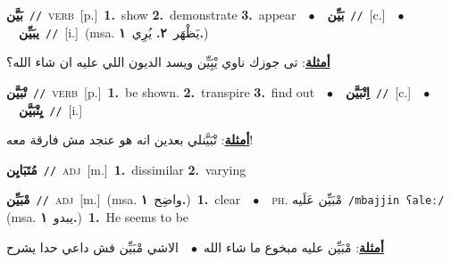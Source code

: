 \documentclass[10pt,a4paper,twoside]{article} %
\begin{document}
\begin{multicols}{2}
{\setlength\topsep{0pt}\textbf{\foreignlanguage{arabic}{بَيَّن}}\ {\color{gray}\texttt{//}\color{black}}\ \textsc{verb}\ [p.]\ \textbf{1.}~show  \textbf{2.}~demonstrate  \textbf{3.}~appear\ \ $\bullet$\ \ \setlength\topsep{0pt}\textbf{\foreignlanguage{arabic}{بَيِّن}}\ {\color{gray}\texttt{//}\color{black}}\ [c.]\ \ $\bullet$\ \ \setlength\topsep{0pt}\textbf{\foreignlanguage{arabic}{يبَيِّن}}\ {\color{gray}\texttt{//}\color{black}}\ [i.]\ \color{gray}(msa. \foreignlanguage{arabic}{يَظْهَر}~\foreignlanguage{arabic}{\textbf{٢.}}  \foreignlanguage{arabic}{يُرِي}~\foreignlanguage{arabic}{\textbf{١.}})\color{black}\  \begin{flushright}\color{gray}\foreignlanguage{arabic}{\textbf{\underline{\foreignlanguage{arabic}{أمثلة}}}: تى جوزك ناوي يْبَِيِّن ويسد الديون اللي عليه ان شاء الله؟}\end{flushright}\color{black}} \vspace{2mm}

{\setlength\topsep{0pt}\textbf{\foreignlanguage{arabic}{تْبَيَّن}}\ {\color{gray}\texttt{//}\color{black}}\ \textsc{verb}\ [p.]\ \textbf{1.}~be shown.  \textbf{2.}~transpire  \textbf{3.}~find out\ \ $\bullet$\ \ \setlength\topsep{0pt}\textbf{\foreignlanguage{arabic}{اِتْبَيَّن}}\ {\color{gray}\texttt{//}\color{black}}\ [c.]\ \ $\bullet$\ \ \setlength\topsep{0pt}\textbf{\foreignlanguage{arabic}{يِتْبَيَّن}}\ {\color{gray}\texttt{//}\color{black}}\ [i.]\  \begin{flushright}\color{gray}\foreignlanguage{arabic}{\textbf{\underline{\foreignlanguage{arabic}{أمثلة}}}: تْبَيَّنلي بعدين انه هو عنجد مش فارقة معه!}\end{flushright}\color{black}} \vspace{2mm}

{\setlength\topsep{0pt}\textbf{\foreignlanguage{arabic}{مُتَبَايِن}}\ {\color{gray}\texttt{//}\color{black}}\ \textsc{adj}\ [m.]\ \textbf{1.}~dissimilar  \textbf{2.}~varying\ } \vspace{2mm}

{\setlength\topsep{0pt}\textbf{\foreignlanguage{arabic}{مْبَيِّن}}\ {\color{gray}\texttt{//}\color{black}}\ \textsc{adj}\ [m.]\ \color{gray}(msa. \foreignlanguage{arabic}{واضِح}~\foreignlanguage{arabic}{\textbf{١.}})\color{black}\ \textbf{1.}~clear\ \ $\bullet$\ \ \textsc{ph.} \color{gray} \foreignlanguage{arabic}{مْبَيِّن عَلَيه}\color{black}\ {\color{gray}\texttt{/{\sffamily mbajjin ʕaleː}/}\color{black}}\ \color{gray} (msa. \foreignlanguage{arabic}{يبدو}~\foreignlanguage{arabic}{\textbf{١.}})\color{black}\ \textbf{1.}~He seems to be\  \begin{flushright}\color{gray}\foreignlanguage{arabic}{\textbf{\underline{\foreignlanguage{arabic}{أمثلة}}}: مْبَيِّن عليه مبخوع ما شاء الله\ $\bullet$\ \  الاشي مْبَيِّن فش داعي حدا يشرح}\end{flushright}\color{black}} \vspace{2mm}

\end{multicols}
\end{document}
